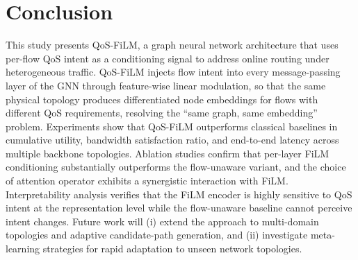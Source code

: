 \section{Conclusion}
\label{sec:conclusion}

This study presents QoS-FiLM, a graph neural network architecture that uses per-flow QoS intent as a conditioning signal to address online routing under heterogeneous traffic. QoS-FiLM injects flow intent into every message-passing layer of the GNN through feature-wise linear modulation, so that the same physical topology produces differentiated node embeddings for flows with different QoS requirements, resolving the ``same graph, same embedding'' problem. Experiments show that QoS-FiLM outperforms classical baselines in cumulative utility, bandwidth satisfaction ratio, and end-to-end latency across multiple backbone topologies. Ablation studies confirm that per-layer FiLM conditioning substantially outperforms the flow-unaware variant, and the choice of attention operator exhibits a synergistic interaction with FiLM. Interpretability analysis verifies that the FiLM encoder is highly sensitive to QoS intent at the representation level while the flow-unaware baseline cannot perceive intent changes. 
Future work will (i) extend the approach to multi-domain topologies and adaptive candidate-path generation, and (ii) investigate meta-learning strategies for rapid adaptation to unseen network topologies.

